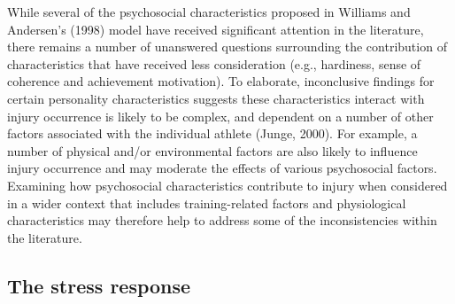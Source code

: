\documentclass[
  english,
  man,floatsintext]{apa6}
\begin{document}
While several of the psychosocial characteristics proposed in Williams and Andersen's (1998) model have received significant attention in the literature, there remains a number of unanswered questions surrounding the contribution of characteristics that have received less consideration (e.g., hardiness, sense of coherence and achievement motivation).
To elaborate, inconclusive findings for certain personality characteristics suggests these characteristics interact with injury occurrence is likely to be complex, and dependent on a number of other factors associated with the individual athlete (Junge, 2000). For example, a number of physical and/or environmental factors are also likely to influence injury occurrence and may moderate the effects of various psychosocial factors.
Examining how psychosocial characteristics contribute to injury when considered in a wider context that includes training-related factors and physiological characteristics may therefore help to address some of the inconsistencies within the literature.

\hypertarget{the-stress-response}{%
\subsection{The stress response}\label{the-stress-response}}
\end{document}
